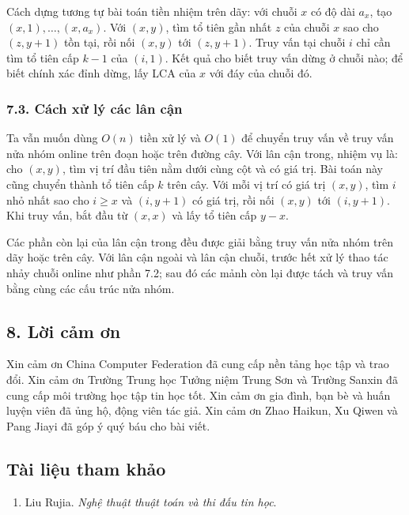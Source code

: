 \documentclass[11pt]{article}
\begin{document}
Cách dựng tương tự bài toán tiền nhiệm trên dãy: với chuỗi \(x\) có độ dài
\(a_x\), tạo \((x,1),\ldots,(x,a_x)\). Với \((x,y)\), tìm tổ tiên gần nhất
\(z\) của chuỗi \(x\) sao cho \((z,y+1)\) tồn tại, rồi nối \((x,y)\) tới
\((z,y+1)\). Truy vấn tại chuỗi \(i\) chỉ cần tìm tổ tiên cấp \(k-1\) của
\((i,1)\). Kết quả cho biết truy vấn dừng ở chuỗi nào; để biết chính xác đỉnh
dừng, lấy LCA của \(x\) với đáy của chuỗi đó.

\subsubsection*{7.3. Cách xử lý các lân cận}

Ta vẫn muốn dùng \(O(n)\) tiền xử lý và \(O(1)\) để chuyển truy vấn về truy vấn
nửa nhóm online trên đoạn hoặc trên đường cây. Với lân cận trong, nhiệm vụ là:
cho \((x,y)\), tìm vị trí đầu tiên nằm dưới cùng cột và có giá trị. Bài toán
này cũng chuyển thành tổ tiên cấp \(k\) trên cây. Với mỗi vị trí có giá trị
\((x,y)\), tìm \(i\) nhỏ nhất sao cho \(i\ge x\) và \((i,y+1)\) có giá trị,
rồi nối \((x,y)\) tới \((i,y+1)\). Khi truy vấn, bắt đầu từ \((x,x)\) và lấy
tổ tiên cấp \(y-x\).

Các phần còn lại của lân cận trong đều được giải bằng truy vấn nửa nhóm trên
dãy hoặc trên cây. Với lân cận ngoài và lân cận chuỗi, trước hết xử lý thao tác
nhảy chuỗi online như phần 7.2; sau đó các mảnh còn lại được tách và truy vấn
bằng cùng các cấu trúc nửa nhóm.

\subsection*{8. Lời cảm ơn}

Xin cảm ơn China Computer Federation đã cung cấp nền tảng học tập và trao đổi.
Xin cảm ơn Trường Trung học Tưởng niệm Trung Sơn và Trường Sanxin đã cung cấp
môi trường học tập tin học tốt. Xin cảm ơn gia đình, bạn bè và huấn luyện viên
đã ủng hộ, động viên tác giả. Xin cảm ơn Zhao Haikun, Xu Qiwen và Pang Jiayi
đã góp ý quý báu cho bài viết.

\subsection*{Tài liệu tham khảo}

\begin{enumerate}
  \item Liu Rujia. \emph{Nghệ thuật thuật toán và thi đấu tin học}.
\end{enumerate}
\end{document}
